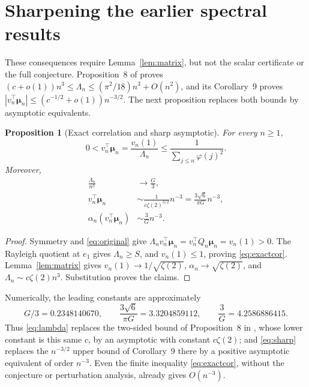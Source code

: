 \documentclass[11pt]{article}
\newtheorem{proposition}[theorem]{Proposition}
\theoremstyle{remark}\newtheorem{remark}[theorem]{Remark}
\newcommand{\muvec}{\boldsymbol\mu}
\begin{document}
\section{Sharpening the earlier spectral results}\label{sec:spectral}
These consequences require Lemma~\ref{lem:matrix}, but not the scalar certificate or the full conjecture. Proposition~8 of \cite{kline} proves $(c+o(1))n^3\le\Lambda_n\le(\pi^2/18)n^3+O(n^2)$, and its Corollary~9 proves $|v_n^\top\muvec_n|\le(c^{-1/2}+o(1))n^{-3/2}$. The next proposition replaces both bounds by asymptotic equivalents.
\begin{proposition}[Exact correlation and sharp asymptotic]\label{prop:cor9}
For every $n\ge1$,
\begin{equation}\label{eq:exactcor}
 0<v_n^\top\muvec_n=\frac{v_n(1)}{\Lambda_n}
 \le\frac1{\sum_{j\le n}\varphi(j)^2}.
\end{equation}
Moreover,
\begin{align}
 \frac{\Lambda_n}{n^3}&\longrightarrow\frac G3,\label{eq:lambda}\\
 v_n^\top\muvec_n&\sim\frac{1}{c\zeta(2)^{3/2}}n^{-3}
 =\frac{3\sqrt6}{\pi G}n^{-3},\label{eq:sharp}\\
 \alpha_n(v_n^\top\muvec_n)&\sim\frac3G n^{-3}.\label{eq:scaled}
\end{align}
\end{proposition}
\begin{proof}
Symmetry and \eqref{eq:original} give
$\Lambda_n v_n^\top\muvec_n=v_n^\top Q_n\muvec_n=v_n(1)>0$.
The Rayleigh quotient at $e_1$ gives $\Lambda_n\ge S$, and $v_n(1)\le1$, proving \eqref{eq:exactcor}. Lemma~\ref{lem:matrix} gives $v_n(1)\to1/\sqrt{\zeta(2)}$, $\alpha_n\to\sqrt{\zeta(2)}$, and $\Lambda_n\sim c\zeta(2)n^3$. Substitution proves the claims.
\end{proof}
Numerically, the leading constants are approximately
\[
 G/3=0.2348140670,\qquad
 \frac{3\sqrt6}{\pi G}=3.3204859112,\qquad
 \frac3G=4.2586886415.
\]
Thus \eqref{eq:lambda} replaces the two-sided bound of Proposition~8 in \cite{kline}, whose lower constant is this same $c$, by an asymptotic with constant $c\zeta(2)$; and \eqref{eq:sharp} replaces the $n^{-3/2}$ upper bound of Corollary~9 there by a positive asymptotic equivalent of order $n^{-3}$. Even the finite inequality \eqref{eq:exactcor}, without the conjecture or perturbation analysis, already gives $O(n^{-3})$.
\end{document}
